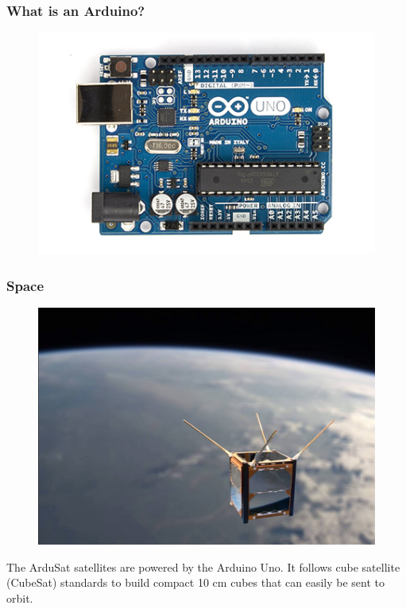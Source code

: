 \begin{frame}
	\frametitle{What is an Arduino?}
	\begin{figure}
		\includegraphics[scale=1.2]{assets/arduino}  
	\end{figure}
\end{frame}

\begin{frame}
	\frametitle{Space}
	\begin{figure}
		\includegraphics[scale=.4]{assets/sat}  
	\end{figure}
	The ArduSat satellites are powered by the Arduino Uno. It follows cube satellite (CubeSat) standards to build compact 10 cm cubes that can easily be sent to orbit. 
\end{frame}

